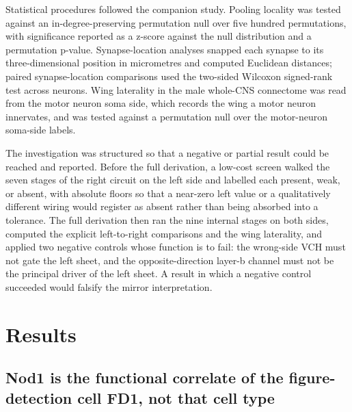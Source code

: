 \documentclass[11pt]{article}
\begin{document}
Statistical procedures followed the companion study. Pooling locality was tested against an
in-degree-preserving permutation null over five hundred permutations, with significance reported
as a z-score against the null distribution and a permutation p-value. Synapse-location analyses
snapped each synapse to its three-dimensional position in micrometres and computed Euclidean
distances; paired synapse-location comparisons used the two-sided Wilcoxon signed-rank test
across neurons. Wing laterality in the male whole-CNS connectome was read from the motor neuron
soma side, which records the wing a motor neuron innervates, and was tested against a permutation
null over the motor-neuron soma-side labels.

The investigation was structured so that a negative or partial result could be reached and
reported. Before the full derivation, a low-cost screen walked the seven stages of the right
circuit on the left side and labelled each present, weak, or absent, with absolute floors so that
a near-zero left value or a qualitatively different wiring would register as absent rather than
being absorbed into a tolerance. The full derivation then ran the nine internal stages on both
sides, computed the explicit left-to-right comparisons and the wing laterality, and applied two
negative controls whose function is to fail: the wrong-side VCH must not gate the left sheet, and
the opposite-direction layer-b channel must not be the principal driver of the left sheet. A
result in which a negative control succeeded would falsify the mirror interpretation.

\section{Results}

\subsection{Nod1 is the functional correlate of the figure-detection cell FD1, not that cell type}
\end{document}
